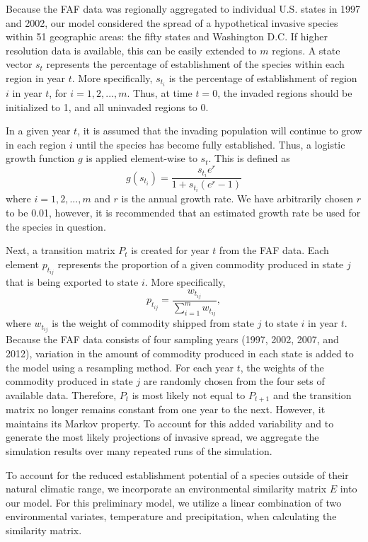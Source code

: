 \documentclass[12pt]{article}
\begin{document}
Because the FAF data was regionally aggregated to  individual U.S. states in 1997 and 2002, our model considered the spread of a hypothetical invasive species within 51 geographic areas: the fifty states and Washington D.C.  If higher resolution data is available, this can be easily extended to $m$ regions.  A state vector $s_t$ represents the percentage of establishment of the species within each region in year $t$.  More specifically, $s_{t_i}$ is the percentage of establishment of region $i$ in year $t$, for $i = 1,2,..., m$.  Thus, at time $t=0$, the invaded regions should be initialized to 1, and all uninvaded regions to 0.    

In a given year $t$, it is assumed that the invading population will continue to grow in each region $i$ until the species has become fully established.  Thus, a logistic growth function $g$ is applied element-wise to $s_t$.  This is defined as
\[ 
	g(s_{t_i}) = \frac{s_{t_i} e^r}{1+s_{t_i} (e^r-1)}
\]
where $i=1,2,...,m$ and $r$ is the annual growth rate.  We have arbitrarily chosen $r$ to be 0.01, however, it is recommended that an estimated growth rate be used for the species in question.

Next, a transition matrix $P_t$ is created for year $t$ from the FAF data.  Each element $p_{t_{ij}}$ represents the proportion of a given commodity produced in state $j$ that is being exported to state $i$.  More specifically, 
\[
p_{t_{ij}} = \frac{w_{t_{ij}}}{\sum_{i=1}^{m} w_{t_{ij}}},  
\]
where $w_{t_{ij}}$ is the weight of commodity shipped from state $j$ to state $i$ in year $t$.  Because the FAF data consists of four sampling years (1997, 2002, 2007, and 2012), variation in the amount of commodity produced in each state is added to the model using a resampling method.  For each year $t$, the weights of the commodity produced in state $j$ are randomly chosen from the four sets of available data.  Therefore, $P_t$ is most likely not equal to $P_{t+1}$ and the transition matrix no longer remains constant from one year to the next.  However, it maintains its Markov property.  To account for this added variability and to generate the most likely projections of invasive spread, we aggregate the simulation results over many repeated runs of the simulation.

To account for the reduced establishment potential of a species outside of their natural climatic range, we incorporate an environmental similarity matrix $E$ into our model. For this preliminary model, we utilize a linear combination of two environmental variates, temperature and precipitation, when calculating the similarity matrix.
\end{document}
